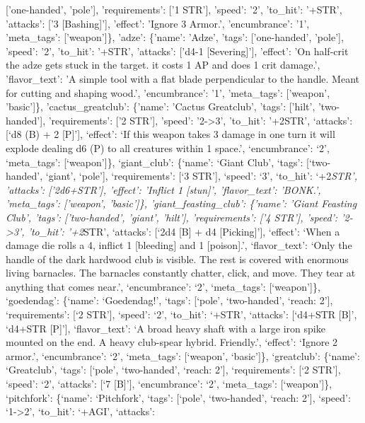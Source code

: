 \documentclass[
  letterpaper,
  DIV=11,
  numbers=noendperiod]{scrartcl}
\begin{document}
{{[}'one-handed', 'pole'{]}, 'requirements': {[}'1 STR'{]}, 'speed': '2',
'to\_hit': '+STR', 'attacks': {[}'3 {[}Bashing{]}'{]}, 'effect': 'Ignore
3 Armor.', 'encumbrance': '1', 'meta\_tags': {[}'weapon'{]}\}, 'adze':
\{'name': 'Adze', 'tags': {[}'one-handed', 'pole'{]}, 'speed': '2',
'to\_hit': '+STR', 'attacks': {[}'d4-1 {[}Severing{]}'{]}, 'effect': 'On
half-crit the adze gets stuck in the target. \nRemoving it costs 1 AP
and does 1 crit damage.', 'flavor\_text': 'A simple tool with a flat
blade perpendicular to the handle. Meant for cutting and shaping wood.',
'encumbrance': '1', 'meta\_tags': {[}'weapon', 'basic'{]}\},
'cactus\_greatclub': \{'name': 'Cactus Greatclub', 'tags': {[}'hilt',
'two-handed'{]}, 'requirements': {[}'2 STR'{]}, 'speed':
'2-\textgreater3', 'to\_hit': '+2}STR', `attacks': {[}`d8 (B) + 2
{[}P{]}'{]}, `effect': `If this weapon takes 3 damage in one turn it
will explode dealing d6 (P) to all creatures within 1 space.',
`encumbrance': `2', `meta\_tags': {[}`weapon'{]}\}, `giant\_club':
\{`name': `Giant Club', `tags': {[}`two-handed', `giant', `pole'{]},
`requirements': {[}`3 STR'{]}, `speed': `3', `to\_hit': `+2\emph{STR',
'attacks': {[}'2d6+STR'{]}, 'effect': 'Inflict 1 {[}stun{]}',
'flavor\_text': 'BONK.', 'meta\_tags': {[}'weapon', 'basic'{]}\},
'giant\_feasting\_club': \{'name': 'Giant Feasting Club', 'tags':
{[}'two-handed', 'giant', 'hilt'{]}, 'requirements': {[}'4 STR'{]},
'speed': '2-\textgreater3', 'to\_hit': '+2}STR', `attacks': {[}`2d4
{[}B{]} + d4 {[}Picking{]}'{]}, `effect': `When a damage die rolls a 4,
inflict 1 {[}bleeding{]} and 1 {[}poison{]}.', `flavor\_text': `Only the
handle of the dark hardwood club is visible. The rest is covered with
enormous living barnacles. The barnacles constantly chatter, click, and
move. They tear at anything that comes near.', `encumbrance': `2',
`meta\_tags': {[}`weapon'{]}\}, `goedendag': \{`name': `Goedendag!',
`tags': {[}`pole', `two-handed', `reach: 2'{]}, `requirements': {[}`2
STR'{]}, `speed': `2', `to\_hit': `+STR', `attacks': {[}`d4+STR
{[}B{]}', `d4+STR {[}P{]}'{]}, `flavor\_text': `A broad heavy shaft with
a large iron spike mounted on the end. A heavy club-spear hybrid.
Friendly.', `effect': `Ignore 2 armor.', `encumbrance': `2',
`meta\_tags': {[}`weapon', `basic'{]}\}, `greatclub': \{`name':
`Greatclub', `tags': {[}`pole', `two-handed', `reach: 2'{]},
`requirements': {[}`2 STR'{]}, `speed': `2', `attacks': {[}`7
{[}B{]}'{]}, `encumbrance': `2', `meta\_tags': {[}`weapon'{]}\},
`pitchfork': \{`name': `Pitchfork', `tags': {[}`pole', `two-handed',
`reach: 2'{]}, `speed': `1-\textgreater2', `to\_hit': `+AGI', `attacks':
\end{document}
